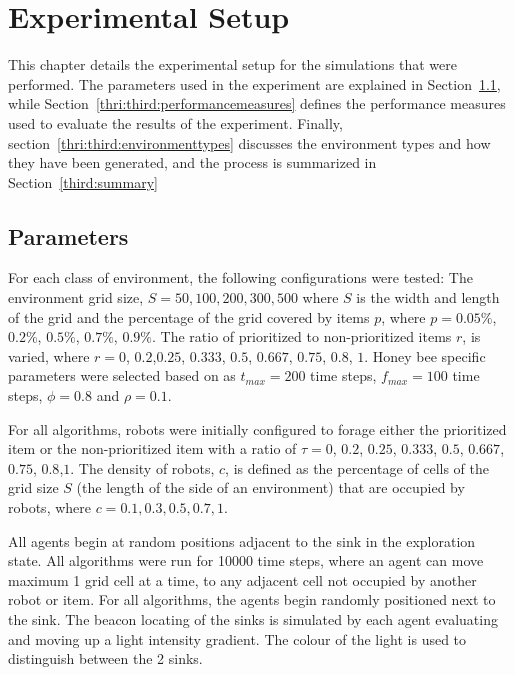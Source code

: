 
\chapter{Experimental Setup}
\label{chap:third}


This chapter details the experimental setup for the simulations that were performed. The parameters used in the experiment are explained in Section~\ref{parameters}, while Section~\ref{thri:third:performancemeasures} defines the performance measures used to evaluate the results of the experiment. Finally, section~\ref{thri:third:environmenttypes} discusses the environment types and how they have been generated, and the process is summarized in Section~\ref{third:summary}


\section{Parameters}
\label{parameters}

For each class of environment, the following configurations were tested: The environment grid size, $S=50,100,200,300, 500$ where $S$ is the width and length of the grid and the percentage of the grid covered by items $p$, where $p= 0.05\%$, $0.2\%$, $0.5\%$, $0.7\%$, $0.9\%$. The ratio of prioritized to non-prioritized items $r$, is varied, where $r=0$, $0.2$,$0.25$, $0.333$, $0.5$, $0.667$, $0.75$, $0.8$, $1$. Honey bee specific parameters were selected based on \cite{seeley2009wisdom} as 
$t_{max}=200$ time steps, $f_{max}=100$ time steps, $\phi=0.8$ and $\rho=0.1$.

For all algorithms, robots were initially configured to forage either the prioritized item or the non-prioritized item with a ratio of $\tau=0$, $0.2$, $0.25$, $0.333$, $0.5$, $0.667$, $0.75$, $0.8$,$1$. The density of robots, $c$, is defined as the percentage of cells of the grid size $S$ (the length of the side of an environment) that are occupied by robots, where $c=0.1, 0.3, 0.5, 0.7, 1$.

All agents begin at random positions adjacent to the sink in the exploration state. All algorithms were run for 10000 time steps, where an agent can move maximum 1 grid cell at a time, to any adjacent cell not occupied by another robot or item. For all algorithms, the agents begin randomly positioned next to the sink. The beacon locating of the sinks is simulated by each agent evaluating and moving up a light intensity gradient. The colour of the light is used to distinguish between the 2 sinks.

